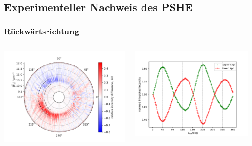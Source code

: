\documentclass[aspectratio=1610]{beamer}
\begin{document}
		\subsection{Experimenteller Nachweis des PSHE}
			\begin{frame}
				\frametitle{Rückwärtsrichtung}
				\begin{columns}
					\begin{column}{0.5\textwidth}
						\includegraphics[width=\textwidth]{figures/spin_hall/diff_back.png}
					\end{column}
					\begin{column}{0.5\textwidth}  %
						\includegraphics[width=\textwidth]{figures/spin_hall/intensity_back.pdf}
					\end{column}
				\end{columns}
			\end{frame}
\end{document}
